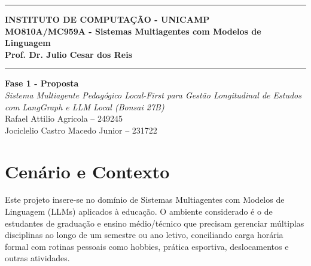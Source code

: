 \documentclass[12pt]{article}
\renewcommand{\headrulewidth}{0pt}
\begin{document}
\vspace{5mm}
\hrule

\vspace{3mm}

\begin{center}
    {\large\textbf{INSTITUTO DE COMPUTAÇÃO - UNICAMP}} \\
    \vspace{3mm}
    {\large\textbf{MO810A/MC959A - Sistemas Multiagentes com Modelos de Linguagem}} \\
    \vspace{3mm}
    {\large\textbf{Prof. Dr. Julio Cesar dos Reis}}
\end{center}

\vspace{3mm}
\hrule

\vspace{2.5cm}
\begin{flushright}
    \Large{\textbf{Fase 1 - Proposta}} \\
    \vspace{1cm}
    \textit{
        Sistema Multiagente Pedagógico Local-First para Gestão Longitudinal de Estudos com LangGraph e LLM Local (Bonsai 27B) \\
    }
    \vspace{5cm}
    Rafael Attilio Agricola -- 249245 \\
    Jociclelio Castro Macedo Junior -- 231722
\end{flushright}


\newpage
\pagestyle{fancy}
\fancyhf{}
\renewcommand{\headrulewidth}{0pt}

\fancyfoot[R]{\thepage}



\section{Cenário e Contexto}
\label{sec:contexto}

Este projeto insere-se no domínio de Sistemas Multiagentes com Modelos de Linguagem (LLMs) aplicados à educação. O ambiente considerado é o de estudantes de graduação e ensino médio/técnico que precisam gerenciar múltiplas disciplinas ao longo de um semestre ou ano letivo, conciliando carga horária formal com rotinas pessoais como hobbies, prática esportiva, deslocamentos e outras atividades.
\end{document}
